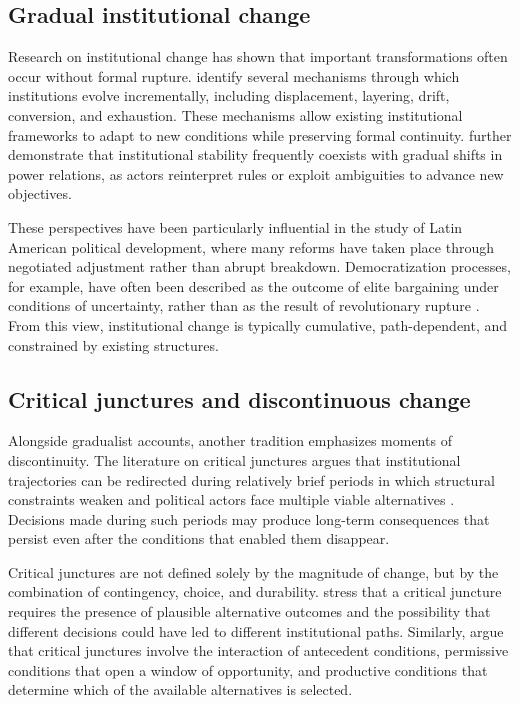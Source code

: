 \documentclass[12pt]{article}
\begin{document}
\subsection*{Gradual institutional change}

Research on institutional change has shown that important transformations
often occur without formal rupture. \textcite{streeck_introduction_2005} identify
several mechanisms through which institutions evolve incrementally,
including displacement, layering, drift, conversion, and exhaustion.
These mechanisms allow existing institutional frameworks to adapt to new
conditions while preserving formal continuity.
\textcite{mahoney_explaining_2010} further demonstrate that institutional
stability frequently coexists with gradual shifts in power relations, as
actors reinterpret rules or exploit ambiguities to advance new objectives.

These perspectives have been particularly influential in the study of
Latin American political development, where many reforms have taken place
through negotiated adjustment rather than abrupt breakdown. Democratization
processes, for example, have often been described as the outcome of elite
bargaining under conditions of uncertainty, rather than as the result of
revolutionary rupture
\autocite{huntington_tercera_2002,odonnell_transitions_1986}. From this view,
institutional change is typically cumulative, path-dependent, and
constrained by existing structures.

\subsection*{Critical junctures and discontinuous change}

Alongside gradualist accounts, another tradition emphasizes moments of
discontinuity. The literature on critical junctures argues that
institutional trajectories can be redirected during relatively brief
periods in which structural constraints weaken and political actors face
multiple viable alternatives
\autocite{collier_shaping_1991,capoccia_study_2007}. Decisions made
during such periods may produce long-term consequences that persist even
after the conditions that enabled them disappear.

Critical junctures are not defined solely by the magnitude of change,
but by the combination of contingency, choice, and durability.
\textcite{capoccia_study_2007} stress that a critical juncture requires
the presence of plausible alternative outcomes and the possibility that
different decisions could have led to different institutional paths.
Similarly, \textcite{slater_informative_2010} argue that critical junctures
involve the interaction of antecedent conditions, permissive conditions
that open a window of opportunity, and productive conditions that
determine which of the available alternatives is selected.
\end{document}
